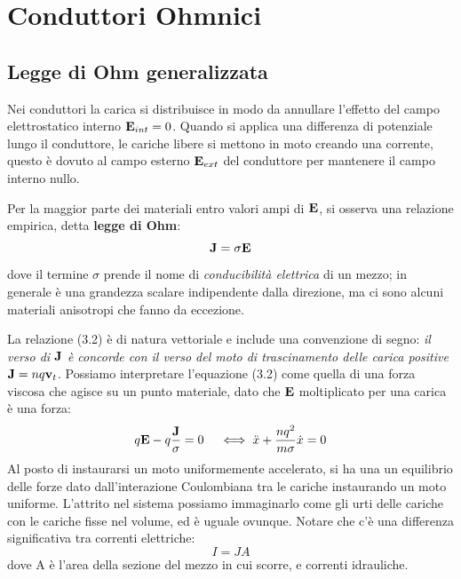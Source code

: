\section{Conduttori Ohmnici}

\subsection{Legge di Ohm generalizzata}

Nei conduttori la carica si distribuisce in modo da annullare l'effetto del campo elettrostatico interno $\bold{E}_{int} = 0$. Quando si applica una differenza di potenziale lungo il conduttore, le cariche libere si mettono in moto creando una corrente, questo \`e dovuto al campo esterno $\bold{E}_{ext}$ del conduttore per mantenere il campo interno nullo.

Per la maggior parte dei materiali entro valori ampi di $\bold{E}$, si osserva una relazione empirica, detta \textbf{legge di Ohm}:
\begin{equation}
	\bold{J} = \sigma \bold{E}
\end{equation}
dove il termine $\sigma$ prende il nome di \textit{conducibilit\`a elettrica} di un mezzo; in generale \`e una grandezza scalare indipendente dalla direzione, ma ci sono alcuni materiali anisotropi che fanno da eccezione.

La relazione (3.2) \`e di natura vettoriale e include una convenzione di segno: \textit{	il verso di $\bold{J}$ \`e concorde con il verso del moto di trascinamento delle carica positive $\bold{J} = nq \bold{v}_{t}$}. Possiamo interpretare l'equazione (3.2) come quella di una forza viscosa che agisce su un punto materiale, dato che $\bold{E}$ moltiplicato per una carica \`e una forza:
\begin{equation*}
	q\bold{E} - q \frac{\bold{J}}{\sigma} = 0 \quad \iff \ddot{x} + \frac{nq^2}{m\sigma}\dot{x} = 0
\end{equation*}
Al posto di instaurarsi un moto uniformemente accelerato, si ha una un equilibrio delle forze dato dall'interazione Coulombiana tra le cariche instaurando un moto uniforme. L'attrito nel sistema possiamo immaginarlo come gli urti delle cariche con le cariche fisse nel volume, ed \`e uguale ovunque. Notare che c'\`e una differenza significativa  tra correnti elettriche:
\begin{equation*}
	I = JA
\end{equation*}
dove A \`e l'area della sezione del mezzo in cui scorre, e correnti idrauliche.

